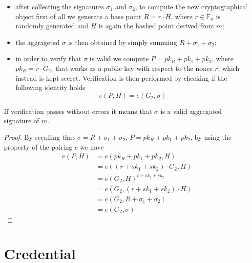 \documentclass[twocolumn]{article}
\begin{document}
\begin{itemize}
    \item after collecting the signatures $\sigma_1$ and $\sigma_2$, to compute the new cryptographical object first of all we generate a base point $R= r\cdot H$, where $r\in\mathbb{F}_n$ is randomly generated and $H$ is again the hashed point derived from $m$;\\
    \item the aggrageted $\sigma$ is then obtained by simply summing $R+\sigma_1+\sigma_2$;
    \item in order to verify that $\sigma$ is valid we compute $P = pk_R + pk_1 + pk_2$, where $pk_R = r\cdot G_2$, that works as a public key with respect to the nonce $r$, which instead is kept secret. Verification is then performed by checking if the following identity holds
    \[ 
    e(P,H) = e(G_2,\sigma)
    \]
\end{itemize}
If verification passes without errors it means that $\sigma$ is a valid aggregated signature of $m$.
\begin{proof}
By recalling that $\sigma = R + \sigma_1 + \sigma_2$, $P = pk_R + pk_1 + pk_2$, by using the property of the pairing $e$ we have
\[
\begin{split}
    e(P,H)  &= e(pk_R + pk_1 + pk_2, H) \\
            &= e((r + sk_1 + sk_2)\cdot G_2,H)\\
            &= e(G_2,H)^{r + sk_1 + sk_2}\\
            &= e(G_2,(r + sk_1 + sk_2)\cdot H) \\
            &= e(G_2,R + \sigma_1 + \sigma_2) \\
            &= e(G_2,\sigma)
\end{split}
\]
\end{proof} 
\section{Credential}
\label{sec:credential}
\end{document}

